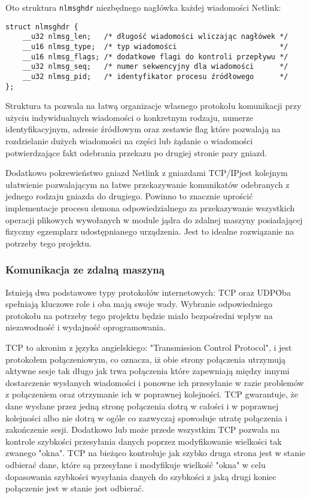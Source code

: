 \documentclass[10pt]{scrartcl}
\begin{document}
Oto struktura \texttt{nlmsghdr} niezbędnego nagłówka każdej wiadomości Netlink:

\begin{verbatim}
struct nlmsghdr {
    __u32 nlmsg_len;   /* długość wiadomości wliczając nagłówek */
    __u16 nlmsg_type;  /* typ wiadomości                        */
    __u16 nlmsg_flags; /* dodatkowe flagi do kontroli przepływu */
    __u32 nlmsg_seq;   /* numer sekwencyjny dla wiadomości      */
    __u32 nlmsg_pid;   /* identyfikator procesu źródłowego      */
};
\end{verbatim}

Struktura ta pozwala na łatwą organizacje własnego protokołu komunikacji przy użyciu indywidualnych wiadomości o konkretnym rodzaju, numerze identyfikacyjnym, adresie źródłowym oraz zestawie flag które pozwalają na rozdzielanie dużych wiadomości na części lub żądanie o wiadomości potwierdzające fakt odebrania przekazu po drugiej stronie pary gniazd.

Dodatkowo pokrewieństwo gniazd Netlink z gniazdami TCP/IP\@ jest kolejnym ułatwienie pozwalającym na łatwe przekazywanie komunikatów odebranych z jednego rodzaju gniazda do drugiego. Powinno to znacznie uprościć implementacje procesu demona odpowiedzialnego za przekazywanie wszystkich operacji plikowych wywołanych w module jądra do zdalnej maszyny posiadającej fizyczny egzemplarz udostępnianego urządzenia. Jest to idealne rozwiązanie na potrzeby tego projektu.

\subsubsection{Komunikacja ze zdalną maszyną}

Istnieją dwa podstawowe typy protokołów internetowych: TCP oraz UDP\. Oba spełniają kluczowe role i oba mają swoje wady. Wybranie odpowiedniego protokołu na potrzeby tego projektu będzie miało bezpośredni wpływ na niezawodność i wydajność oprogramowania.

TCP to akronim z języka angielskiego: "Transmission Control Protocol", i jest protokołem połączeniowym, co oznacza, iż obie strony połączenia utrzymują aktywne sesje tak długo jak trwa połączenia które zapewniają między innymi dostarczenie wysłanych wiadomości i ponowne ich przesyłanie w razie problemów z połączeniem oraz otrzymanie ich w poprawnej kolejności. TCP gwarantuje, że dane wysłane przez jedną stronę połączenia dotrą w całości i w poprawnej kolejności albo nie dotrą w ogóle co zazwyczaj spowoduje utratę połączenia i zakończenie sesji. Dodatkowo lub może przede wszystkim TCP pozwala na kontrole szybkości przesyłania danych poprzez modyfikowanie wielkości tak zwanego "okna". TCP na bieżąco kontroluje jak szybko druga strona jest w stanie odbierać dane, które są przesyłane i modyfikuje wielkość "okna" w celu dopasowania szybkości wysyłania danych do szybkości z jaką drugi koniec połączenie jest w stanie jest odbierać.
\end{document}
